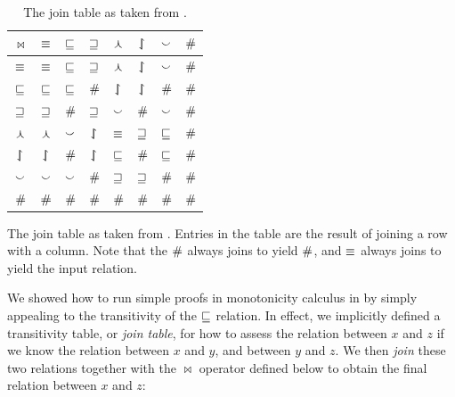 %
%


\begin{table}[t]
	\begin{center}
	\begin{tabular}{|c||c|c|c|c|c|c|c|}
    \hline
    $\bowtie$ & $\equiv$ & $\sqsubseteq$ & $\sqsupseteq$ & $\curlywedge$ & $\downharpoonleft\hspace{-1.25mm}\upharpoonright$ & $\smallsmile$ & $\#$ \\
    \hline
    $\equiv$ & $\equiv$ & $\sqsubseteq$ & $\sqsupseteq$ & $\curlywedge$ & $\downharpoonleft\hspace{-1.25mm}\upharpoonright$ & $\smallsmile$ & $\#$ \\
    $\sqsubseteq$ & $\sqsubseteq$ & $\sqsubseteq$ & $\#$ & $\downharpoonleft\hspace{-1.25mm}\upharpoonright$ & $\downharpoonleft\hspace{-1.25mm}\upharpoonright$ & $\#$ & $\#$ \\
    $\sqsupseteq$ & $\sqsupseteq$ & $\#$ & $\sqsupseteq$ & $\smallsmile$ & $\#$ & $\smallsmile$ & $\#$  \\
    $\curlywedge$ & $\curlywedge$ & $\smallsmile$ & $\downharpoonleft\hspace{-1.25mm}\upharpoonright$ & $\equiv$ & $\sqsupseteq$ & $\sqsubseteq$ & $\#$  \\
    $\downharpoonleft\hspace{-1.25mm}\upharpoonright$ & $\downharpoonleft\hspace{-1.25mm}\upharpoonright$ & $\#$ & $\downharpoonleft\hspace{-1.25mm}\upharpoonright$ & $\sqsubseteq$ & $\#$ & $\sqsubseteq$ & $\#$  \\
    $\smallsmile$ & $\smallsmile$ & $\smallsmile$ & $\#$ & $\sqsupseteq$ & $\sqsupseteq$ & $\#$ & $\#$  \\
    $\#$ & $\#$ & $\#$ & $\#$ & $\#$ & $\#$ & $\#$ & $\#$ \\
    \hline
	\end{tabular}
	\caption{The join table as taken from .}
  {
    The join table as taken from .
    Entries in the table are the result of joining a row with a
      column.
    Note that the $\#$ always joins to yield $\#$,
    and $\equiv$ always joins to yield the input relation.
		\label{tab:natlog-jointable}
	}
	\end{center}
\end{table}



We showed how to run simple proofs in monotonicity calculus in 
   by simply appealing to the transitivity of the
  $\sqsubseteq$ relation.
In effect, we implicitly defined a transitivity table, or \textit{join table},
  for how to assess the relation between $x$ and $z$ if we know the relation
  between $x$ and $y$, and between $y$ and $z$.
We then \textit{join} these two relations together with the $\bowtie$ operator defined
  below to obtain the final relation between $x$ and $z$:
	
